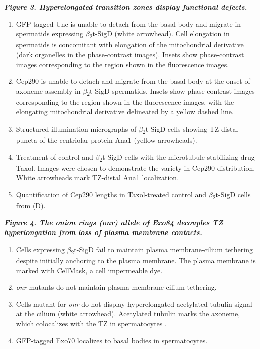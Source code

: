 \documentclass[12pt, twoside, letterpaper]{article}
\newcommand{\sigd}{$\beta$\textsubscript{2}t-SigD}
\begin{document}
\begin{doublespacing}
\begin{linenumbers}
\begin{enumerate}[label={(\Alph*)}, nolistsep]
    \end{enumerate}
    \bigskip
    \textbf{\itshape Figure 3. Hyperelongated transition zones display functional defects.}
    \begin{enumerate}[label={(\Alph*)}, nolistsep]
    \item GFP-tagged Unc is unable to detach from the basal body and migrate in spermatids expressing \sigd{} (white arrowhead).
      Cell elongation in spermatids is concomitant with elongation of the mitochondrial derivative (dark organelles in the phase-contrast images).
      Insets show phase-contrast images corresponding to the region shown in the fluorescence images.
    \item Cep290 is unable to detach and migrate from the basal body at the onset of axoneme assembly in \sigd{} spermatids.
      Insets show phase contrast images corresponding to the region shown in the fluorescence images, with the
      elongating mitochondrial derivative delineated by a yellow dashed line.
    \item Structured illumination micrographs of \sigd{} cells showing TZ-distal puncta of the centriolar protein Ana1 (yellow arrowheads).
    \item Treatment of control and \sigd{} cells with the microtubule stabilizing drug Taxol.
      Images were chosen to demonstrate the variety in Cep290 distribution.
      White arrowheads mark TZ-distal Ana1 localization.
    \item Quantification of Cep290 lengths in Taxol-treated control and \sigd{} cells from (D).
    \end{enumerate}
    \bigskip
    \textbf{\itshape Figure 4. The \textit{onion rings} (\textit{onr}) allele of Exo84 decouples TZ hyperlongation from loss of plasma membrane contacts.}
    \begin{enumerate}[label={(\Alph*)}, nolistsep]
    \item Cells expressing \sigd{} fail to maintain plasma membrane-cilium tethering despite initially anchoring to the plasma membrane.
      The plasma membrane is marked with CellMask, a cell impermeable dye.
    \item \textit{onr} mutants do not maintain plasma membrane-cilium tethering.
    \item Cells mutant for \textit{onr} do not display hyperelongated acetylated tubulin signal at the cilium (white arrowhead).
      Acetylated tubulin marks the axoneme, which colocalizes with the TZ in spermatocytes \citep{pratt2016drosophila}.
    \item GFP-tagged Exo70 localizes to basal bodies in spermatocytes.
    \end{enumerate}
    
  \end{linenumbers}
\end{doublespacing}
\end{document}
